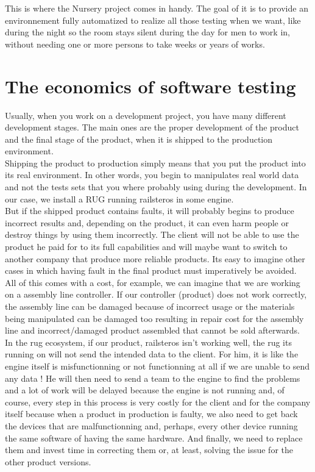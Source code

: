\documentclass[12pt]{article}
\begin{document}
This is where the Nursery project comes in handy. The goal of it is to provide an environnement fully automatized to realize all those testing when we want, like during the night so the room stays silent during the day for men to work in, without needing one or more persons to take weeks or years of works.

\section{The economics of software testing}

Usually, when you work on a development project, you have many different development stages. The main ones are the proper development of the product and the final stage of the product, when it is shipped to the production environment.\\

Shipping the product to production simply means that you put the product into its real environment. In other words, you begin to manipulates real world data and not the tests sets that you where probably using during the development. In our case, we install a RUG running \gls{railsteros} in some engine.\\

But if the shipped product contains faults, it will probably begins to produce incorrect results and, depending on the product, it can even harm people or destroy things by using them incorrectly. The client will not be able to use the product he paid for to its full capabilities and will maybe want to switch to another company that produce more reliable products. Its easy to imagine other cases in which having fault in the final product must imperatively be avoided.\\

All of this comes with a cost, for example, we can imagine that we are working on a assembly line controller. If our controller (product) does not work correctly, the assembly line can be damaged because of incorrect usage or the materials being manipulated can be damaged too resulting in repair cost for the assembly line and incorrect/damaged product assembled that cannot be sold afterwards.\\

In the \gls{rug} ecosystem, if our product, \gls{railsteros} isn't working well, the \gls{rug} its running on will not send the intended data to the client. For him, it is like the engine itself is misfunctionning or not functionning at all if we are unable to send any data ! He will then need to send a team to the engine to find the problems and a lot of work will be delayed because the engine is not running and, of course, every step in this process is very costly for the client and for the company itself because when a product in production is faulty, we also need to get back the devices that are malfunctionning and, perhaps, every other device running the same software of having the same hardware. And finally, we need to replace them and invest time in correcting them or, at least, solving the issue for the other product versions.\\
\end{document}
